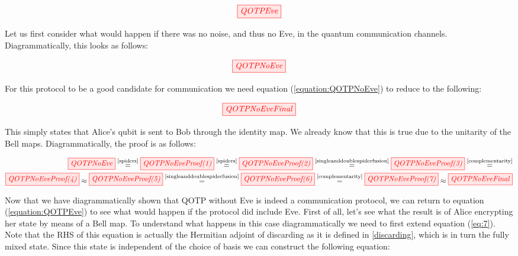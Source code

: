 \documentclass[]{article}
\newcommand{\equaltext}[1]{\ensuremath{\stackrel{\text{#1}}{=}}}
\begin{document}
\begin{equation}
\tikzfig{QOTPEve}
\label{equation:QOTPEve}
\end{equation}

Let us first consider what would happen if there was no noise, and thus no Eve, in the quantum communication channels. Diagrammatically, this looks as follows:

\begin{equation}
	\tikzfig{QOTPNoEve}
	\label{equation:QOTPNoEve}
\end{equation}

For this protocol to be a good candidate for communication we need equation (\ref{equation:QOTPNoEve}) to reduce to the following: 

\begin{equation}
	\tikzfig{QOTPNoEveFinal}
\end{equation}

This simply states that Alice's qubit is sent to Bob through the identity map. We already know that this is true due to the unitarity of the Bell maps. Diagrammatically, the proof is as follows:

\begin{equation}
	\begin{split}
	\tikzfig{QOTPNoEve} \equaltext{\ref{spiders}} 
	\tikzfig{QOTPNoEveProof(1)} \equaltext{\ref{spiders}}
	\tikzfig{QOTPNoEveProof(2)} \equaltext{\ref{singleanddoublespiderfusion}}
	\tikzfig{QOTPNoEveProof(3)} \equaltext{\ref{complementarity}} \\
	\tikzfig{QOTPNoEveProof(4)} \approx
	\tikzfig{QOTPNoEveProof(5)} \equaltext{\ref{singleanddoublespiderfusion}}
	\tikzfig{QOTPNoEveProof(6)} \equaltext{\ref{complementarity}}
	\tikzfig{QOTPNoEveProof(7)} \approx
	\tikzfig{QOTPNoEveFinal}
	\end{split}
\end{equation}

Now that we have diagrammatically shown that QOTP without Eve is indeed a communication protocol, we can return to equation (\ref{equation:QOTPEve}) to see what would happen if the protocol did include Eve. First of all, let's see what the result is of Alice encrypting her state by means of a Bell map. To understand what happens in this case diagrammatically we need to first extend equation (\ref{eq:7}). Note that the RHS of this equation is actually the Hermitian adjoint of discarding as it is defined in \ref{discarding}, which is in turn the fully mixed state. Since this state is independent of the choice of basis we can construct the following equation:
\end{document}

